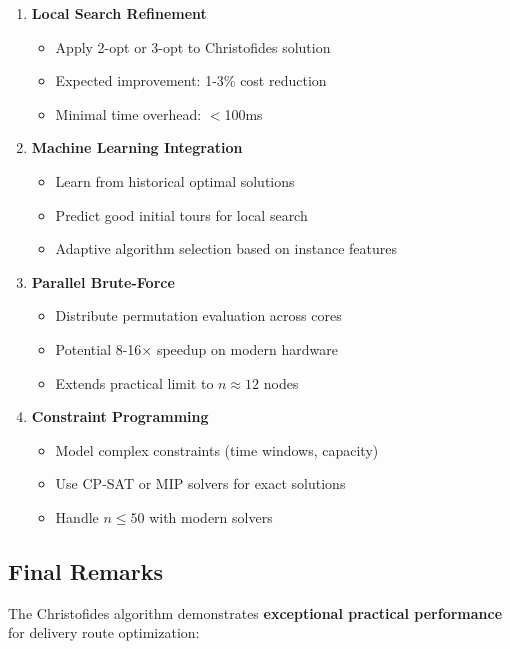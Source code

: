 \documentclass[9pt,a4paper,twoside]{tau}
\begin{document}
\begin{enumerate}
    \item \textbf{Local Search Refinement}
    \begin{itemize}
        \item Apply 2-opt or 3-opt to Christofides solution
        \item Expected improvement: 1-3\% cost reduction
        \item Minimal time overhead: $<$100ms
    \end{itemize}
    
    \item \textbf{Machine Learning Integration}
    \begin{itemize}
        \item Learn from historical optimal solutions
        \item Predict good initial tours for local search
        \item Adaptive algorithm selection based on instance features
    \end{itemize}
    
    \item \textbf{Parallel Brute-Force}
    \begin{itemize}
        \item Distribute permutation evaluation across cores
        \item Potential 8-16$\times$ speedup on modern hardware
        \item Extends practical limit to $n \approx 12$ nodes
    \end{itemize}
    
    \item \textbf{Constraint Programming}
    \begin{itemize}
        \item Model complex constraints (time windows, capacity)
        \item Use CP-SAT or MIP solvers for exact solutions
        \item Handle $n \leq 50$ with modern solvers
    \end{itemize}
\end{enumerate}

\subsection{Final Remarks}

The Christofides algorithm demonstrates \textbf{exceptional practical performance} for delivery route optimization:
\end{document}
